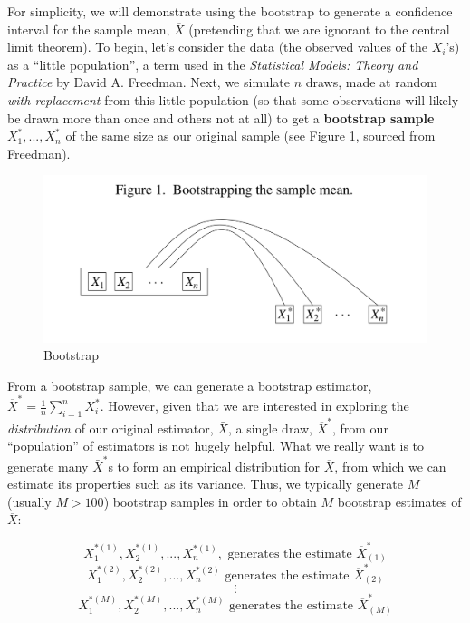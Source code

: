 For simplicity, we will demonstrate using the bootstrap to generate a confidence interval for the sample mean, $\overline{X}$ (pretending that we are ignorant to the central limit theorem). To begin, let's consider the data (the observed values of the $X_i$'s) as a ``little population'', a term used in the \textit{Statistical Models: Theory and Practice} by David A. Freedman. Next, we simulate $n$ draws, made at random \textit{with replacement} from this little population (so that some observations will likely be drawn more than once and others not at all) to get a \textbf{bootstrap sample} $X_1^*, ..., X_n^*$ of the same size as our original sample (see Figure 1, sourced from Freedman).


\begin{figure}[H]
\begin{center}
\includegraphics[scale=0.3]{Bootstrap.png}
\end{center}
\caption{Bootstrap}
\label{fig:bootstrap}
\end{figure}


From a bootstrap sample, we can generate a bootstrap estimator, $\overline{X}^* = \frac{1}{n} \sum_{i=1}^n X_i^*$. However, given that we are interested in exploring the \textit{distribution} of our original estimator, $\bar{X}$, a single draw, $\overline{X}^*$, from our ``population'' of estimators is not hugely helpful. What we really want is to generate many $\bar{X}^*$s to form an empirical distribution for $\overline{X}$, from which we can estimate its properties such as its variance. Thus, we typically generate $M$ (usually $M > 100$) bootstrap samples in order to obtain $M$ bootstrap estimates of $\overline{X}$:

$$X_1^{*(1)}, X_2^{*(1)}, ..., X_n^{*(1)}, \text{ generates the estimate } \overline{X}_{(1)}^{*}$$
$$X_1^{*(2)}, X_2^{*(2)}, ..., X_n^{*(2)} \text{ generates the estimate } \overline{X}_{(2)}^{*}$$
$$ \vdots $$
$$X_1^{*(M)}, X_2^{*(M)}, ..., X_n^{*(M)} \text{ generates the estimate } \overline{X}_{(M)}^{*}$$


